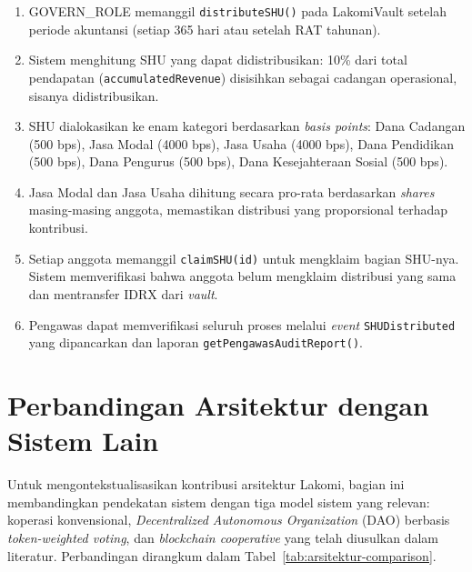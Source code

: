 \begin{enumerate}
	\item GOVERN\_ROLE memanggil \texttt{distributeSHU()} pada LakomiVault setelah periode akuntansi (setiap 365 hari atau setelah RAT tahunan).
	\item Sistem menghitung SHU yang dapat didistribusikan: 10\% dari total pendapatan (\texttt{accumulatedRevenue}) disisihkan sebagai cadangan operasional, sisanya didistribusikan.
	\item SHU dialokasikan ke enam kategori berdasarkan \textit{basis points}: Dana Cadangan (500 bps), Jasa Modal (4000 bps), Jasa Usaha (4000 bps), Dana Pendidikan (500 bps), Dana Pengurus (500 bps), Dana Kesejahteraan Sosial (500 bps).
	\item Jasa Modal dan Jasa Usaha dihitung secara pro-rata berdasarkan \textit{shares} masing-masing anggota, memastikan distribusi yang proporsional terhadap kontribusi.
	\item Setiap anggota memanggil \texttt{claimSHU(id)} untuk mengklaim bagian SHU-nya. Sistem memverifikasi bahwa anggota belum mengklaim distribusi yang sama dan mentransfer IDRX dari \textit{vault}.
	\item Pengawas dapat memverifikasi seluruh proses melalui \textit{event} \texttt{SHUDistributed} yang dipancarkan dan laporan \texttt{getPengawasAuditReport()}.
\end{enumerate}

\section{Perbandingan Arsitektur dengan Sistem Lain}

Untuk mengontekstualisasikan kontribusi arsitektur Lakomi, bagian ini membandingkan pendekatan sistem dengan tiga model sistem yang relevan: koperasi konvensional, \textit{Decentralized Autonomous Organization} (DAO) berbasis \textit{token-weighted voting}, dan \textit{blockchain cooperative} yang telah diusulkan dalam literatur. Perbandingan dirangkum dalam Tabel~\ref{tab:arsitektur-comparison}.

